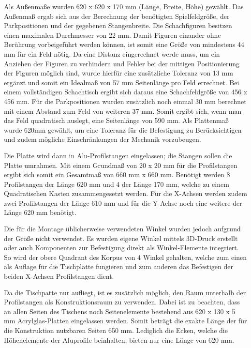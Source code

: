 Als Außenmaße wurden 620 x 620 x 170 mm (Länge, Breite, Höhe) gewählt.
Das Außenmaß ergab sich aus der Berechnung der benötigten
Spielfeldgröße, der Parkpositionen und der gegebenen Stangenbreite. Die
Schachfiguren besitzen einen maximalen Durchmesser von 22 mm. Damit
Figuren einander ohne Berührung vorbeigeführt werden können, ist somit
eine Größe von mindestens 44 mm für ein Feld nötig. Da eine Distanz
eingerechnet werde muss, um ein Anziehen der Figuren zu verhindern und
Fehler bei der mittigen Positionierung der Figuren möglich sind, wurde
hierfür eine zusätzliche Toleranz von 13 mm ergänzt und somit ein
Idealmaß von 57 mm Seitenlänge pro Feld errechnet. Bei einem
vollständigen Schachtisch ergibt sich daraus eine Schachfeldgröße von
456 x 456 mm. Für die Parkpositionen wurden zusätzlich noch einmal 30 mm
berechnet mit einem Abstand zum Feld von weiteren 37 mm. Somit ergibt
sich, wenn man das Feld quadratisch auslegt, eine Seitenlänge von 590
mm. Als Plattenmaß wurde 620mm gewählt, um eine Toleranz für die
Befestigung zu Berücksichtigen und zudem mögliche Einschränkungen der
Mechanik vorzubeugen.

Die Platte wird dann in Alu-Profilstangen eingelassen; die Stangen
sollen die Platte umrahmen. Mit einem Grundmaß von 20 x 20 mm für die
Profilstangen ergibt sich somit ein Gesamtmaß von 660 mm x 660 mm.
Benötigt werden 8 Profilstangen der Länge 620 mm und 4 der Länge 170 mm,
welche zu einem Quadratischen Kasten zusammengesetzt werden. Für die
X-Achsen werden zudem zwei Profilstangen der Länge 610 mm und für die
Y-Achse noch eine weitere der Länge 620 mm benötigt.

Die für die Montage üblicherweise verwendeten Winkel wurden jedoch
aufgrund der Größe nicht verwendet. Es wurden eigene Winkel mittels
3D-Druck erstellt oder auch Komponenten zur Befestigung direkt als
Winkel-Elemente integriert. So wird der obere Quadrant des Korpus von 4
Winkel gehalten, welche zum einen als Auflage für die Tischplatte
fungieren und zum anderen das Befestigen der beiden X-Achsen
Profilstangen dient.

Da die Tischpatte nur aufliegt, ist es zusätzlich möglich, den Raum
unterhalb der Profilstangen als Konstruktionsraum zu verwenden. Dabei
ist zu beachten, dass an allen Seiten des Tischens noch Seitenelemente
bestehend aus 620 x 130 x 5 mm Acrylglas-Platten eingelassen werden.
Somit beträgt die exakte Länge der für die Konstruktion nutzbaren Seiten
650 mm. Lediglich die Ecken, welche die Höhenelemente der Aluprofile
beinhalten, bieten nur eine Länge von 620 mm.

